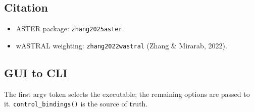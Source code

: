 \documentclass[11pt]{report}
\begin{document}
\subsection{Citation}

\begin{itemize}
  \item ASTER package: \texttt{zhang2025aster}.
  \item wASTRAL weighting: \texttt{zhang2022wastral} (Zhang \& Mirarab, 2022).
\end{itemize}

\subsection{GUI to CLI}

The first argv token selects the executable; the remaining options are passed to it. \texttt{control\_\allowbreak bindings\allowbreak ()} is the source of truth.
\end{document}
